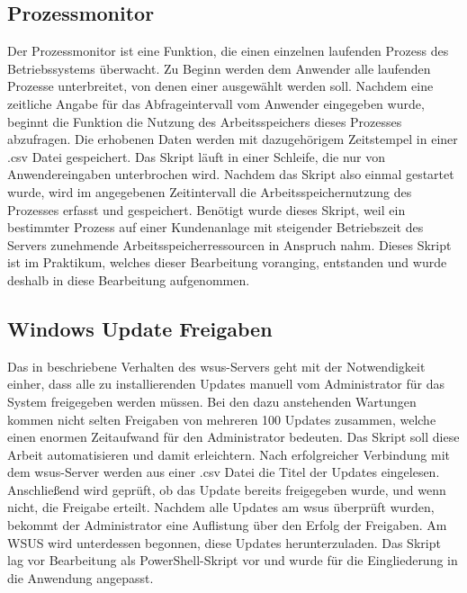 \subsection{Prozessmonitor}\vspace{-5mm}
Der Prozessmonitor ist eine Funktion, die einen einzelnen laufenden Prozess des Betriebssystems überwacht. Zu Beginn werden dem Anwender alle laufenden Prozesse unterbreitet, von denen einer ausgewählt werden soll. Nachdem eine zeitliche Angabe für das Abfrageintervall vom Anwender eingegeben wurde, beginnt die Funktion die Nutzung des Arbeitsspeichers dieses Prozesses abzufragen. Die erhobenen Daten werden mit dazugehörigem Zeitstempel in einer .csv Datei gespeichert. Das Skript läuft in einer Schleife, die nur von Anwendereingaben unterbrochen wird. Nachdem das Skript also einmal gestartet wurde, wird im angegebenen Zeitintervall die Arbeitsspeichernutzung des Prozesses erfasst und gespeichert. Benötigt wurde dieses Skript, weil ein bestimmter Prozess auf einer Kundenanlage mit steigender Betriebszeit des Servers zunehmende Arbeitsspeicherressourcen in Anspruch nahm. Dieses Skript ist im Praktikum, welches dieser Bearbeitung voranging, entstanden und wurde deshalb in diese Bearbeitung aufgenommen.\vspace{-7mm}
\subsection{Windows Update Freigaben}\vspace{-5mm}
Das in  beschriebene Verhalten des \acrshort{wsus}-Servers geht mit der Notwendigkeit einher, dass alle zu installierenden Updates manuell vom Administrator für das System freigegeben werden müssen. Bei den dazu anstehenden Wartungen kommen nicht selten Freigaben von mehreren 100 Updates zusammen, welche einen enormen Zeitaufwand für den Administrator bedeuten. Das Skript soll diese Arbeit automatisieren und damit erleichtern. Nach erfolgreicher Verbindung mit dem \acrshort{wsus}-Server werden aus einer .csv Datei die Titel der Updates eingelesen. Anschließend wird geprüft, ob das Update bereits freigegeben wurde, und wenn nicht, die Freigabe erteilt. Nachdem alle Updates am \acrshort{wsus} überprüft wurden, bekommt der Administrator eine Auflistung über den Erfolg der Freigaben. Am WSUS wird unterdessen begonnen, diese Updates herunterzuladen.
Das Skript lag vor Bearbeitung als PowerShell-Skript vor und wurde für die Eingliederung in die Anwendung angepasst.
